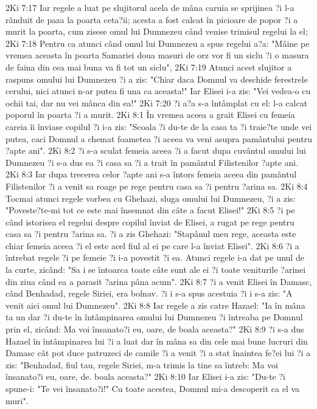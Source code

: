 2Ki 7:17  Iar regele a luat pe slujitorul acela de mâna caruia se sprijinea ?i l-a rânduit de paza la poarta ceta?ii; acesta a fost calcat în picioare de popor ?i a murit la poarta, cum zisese omul lui Dumnezeu când venise trimisul regelui la el;
2Ki 7:18  Pentru ca atunci când omul lui Dumnezeu a spus regelui a?a: "Mâine pe vremea aceasta în poarta Samariei doua masuri de orz vor fi un siclu ?i o masura de faina din cea mai buna va fi tot un siclu",
2Ki 7:19  Atunci acest slujitor a raspuns omului lui Dumnezeu ?i a zis: "Chiar daca Domnul va deschide ferestrele cerului, nici atunci n-ar putea fi una ca aceasta!" Iar Elisei i-a zis: "Vei vedea-o cu ochii tai, dar nu vei mânca din ea!"
2Ki 7:20  ?i a?a s-a întâmplat cu el: l-a calcat poporul în poarta ?i a murit.
2Ki 8:1  În vremea aceea a grait Elisei cu femeia careia îi înviase copilul ?i i-a zis: "Scoala ?i du-te de la casa ta ?i traie?te unde vei putea, caci Domnul a chemat foametea ?i aceea va veni asupra pamântului pentru ?apte ani".
2Ki 8:2  ?i s-a sculat femeia aceea ?i a facut dupa cuvântul omului lui Dumnezeu ?i s-a dus ea ?i casa sa ?i a trait în pamântul Filistenilor ?apte ani.
2Ki 8:3  Iar dupa trecerea celor ?apte ani s-a întors femeia aceea din pamântul Filistenilor ?i a venit sa roage pe rege pentru casa sa ?i pentru ?arina sa.
2Ki 8:4  Tocmai atunci regele vorbea cu Ghehazi, sluga omului lui Dumnezeu, ?i a zis: "Poveste?te-mi tot ce este mai însemnat din câte a facut Elisei!"
2Ki 8:5  ?i pe când istorisea el regelui despre copilul înviat de Elisei, a rugat pe rege pentru casa sa ?i pentru ?arina sa. ?i a zis Ghehazi: "Stapânul meu rege, aceasta este chiar femeia aceea ?i el este acel fiul al ei pe care l-a înviat Elisei".
2Ki 8:6  ?i a întrebat regele ?i pe femeie ?i i-a povestit ?i ea. Atunci regele i-a dat pe unul de la curte, zicând: "Sa i se întoarca toate câte sunt ale ei ?i toate veniturile ?arinei din ziua când ea a parasit ?arina pâna acum".
2Ki 8:7  ?i a venit Elisei în Damasc, când Benhadad, regele Siriei, era bolnav. ?i i s-a spus acestuia ?i i s-a zis: "A venit aici omul lui Dumnezeu".
2Ki 8:8  Iar regele a zis catre Hazael: "Ia în mâna ta un dar ?i du-te în întâmpinarea omului lui Dumnezeu ?i întreaba pe Domnul prin el, zicând: Ma voi însanato?i eu, oare, de boala aceasta?"
2Ki 8:9  ?i s-a dus Hazael în întâmpinarea lui ?i a luat dar în mâna sa din cele mai bune lucruri din Damasc cât pot duce patruzeci de camile ?i a venit ?i a stat înaintea fe?ei lui ?i a zis: "Benhadad, fiul tau, regele Siriei, m-a trimis la tine sa întreb: Ma voi însanato?i eu, oare, de. boala aceasta?"
2Ki 8:10  Iar Elisei i-a zis: "Du-te ?i spune-i: "Te vei însanato?i!" Cu toate acestea, Domnul mi-a descoperit ca el va muri".
